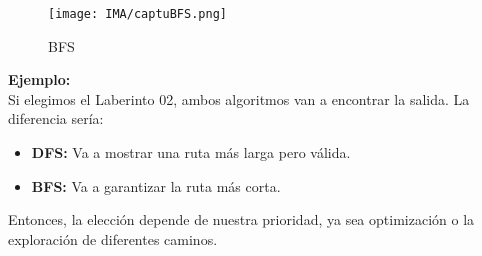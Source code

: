 \begin{figure}[h]
    \centering
    \texttt{[image: IMA/captuBFS.png]}
    \caption{BFS}
    \label{fig:enter-label}
\end{figure}
\vspace{0.5cm}

\textbf{Ejemplo:}\\

Si elegimos el Laberinto 02, ambos algoritmos van a encontrar la salida. La diferencia sería:

\begin{itemize}
    \item \textbf{DFS:} Va a mostrar una ruta más larga pero válida.
    \item \textbf{BFS:} Va a garantizar la ruta más corta.
\end{itemize}

Entonces, la elección depende de nuestra prioridad, ya sea optimización o la exploración 
de diferentes caminos.